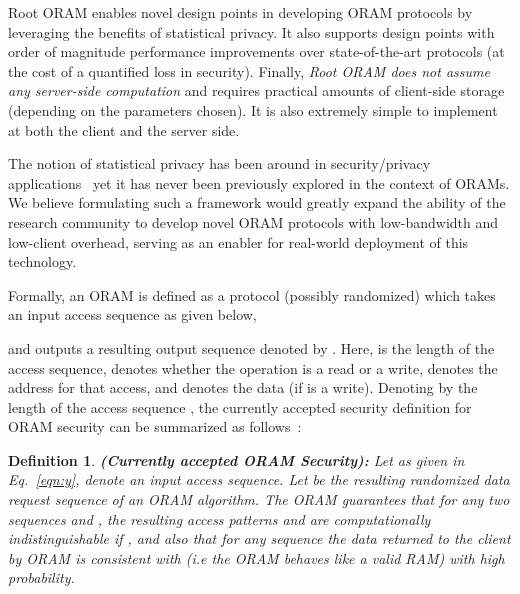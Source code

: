\documentclass[USenglish,oneside,twocolumn]{article}
\makeatletter
\newcommand{\ourprotocol}{Root ORAM}
\let\origsection\section
\renewcommand\section{\@ifstar{\starsection}{\nostarsection}}
\newcommand\nostarsection[1]
{\sectionprelude\origsection{#1}\sectionpostlude}
\newcommand\starsection[1]
{\sectionprelude\origsection*{#1}\sectionpostlude}
\newcommand\sectionprelude{\vspace{-1em}
}
\newcommand\sectionpostlude{\vspace{-1em}
}
\newtheorem{defn}{Definition}
\makeatother
\begin{document}
\ourprotocol{} enables novel design points in developing ORAM protocols by 
leveraging the benefits of statistical privacy. It also supports design 
points with order of magnitude performance improvements over state-of-the-art 
protocols (at the cost of a quantified loss in security). 
Finally, \textit{\ourprotocol{} does not assume any server-side computation} 
and requires practical amounts of client-side storage (depending on the 
parameters chosen). It is also extremely simple to implement at both the client 
and the server side.



 \section{Differentially Private ORAM}\label{sec:statisticaloram}

The notion of statistical privacy has been around in security/privacy applications~\cite{bellare1993efficient, liang2009information, mittal2012information} yet it has never been previously explored in the context of ORAMs. We believe formulating such a framework would greatly expand the ability of the research community to develop novel ORAM protocols with low-bandwidth and low-client overhead, serving as an enabler for real-world deployment of this technology.

Formally, an ORAM is defined as a protocol (possibly randomized) which takes an input access sequence  as given below,

and outputs a resulting output sequence denoted by . Here,  is the length of the access sequence,  denotes whether the  operation is a read or a write,  denotes the address for that access, and  denotes the data (if  is a write). Denoting by  the length of the access sequence , the currently accepted security definition for ORAM security can be summarized as follows~\cite{pathoram}:





\begin{defn}
\textbf{(Currently accepted ORAM Security): } \textit{Let  as given in Eq.~\ref{eqn:y}, denote an input access sequence. Let  be the resulting randomized data request sequence of an ORAM algorithm. The ORAM guarantees that for any two sequences  and , the resulting access patterns  and  are computationally indistinguishable if , and also that for any sequence  the data returned to the client by ORAM is consistent with  (i.e the ORAM behaves like a valid RAM) with high probability.}
\end{defn}
\end{document}
